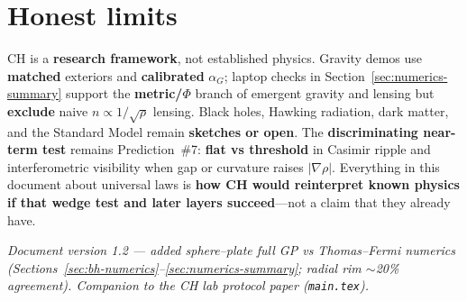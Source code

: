 \documentclass[11pt,a4paper]{article}
\begin{document}
\section{Honest limits}

CH is a \textbf{research framework}, not established physics.
Gravity demos use \textbf{matched} exteriors and \textbf{calibrated} $\alpha_G$; laptop checks in Section~\ref{sec:numerics-summary} support the \textbf{metric/$\Phi$} branch of emergent gravity and lensing but \textbf{exclude} naive $n \propto 1/\sqrt{\rho}$ lensing.
Black holes, Hawking radiation, dark matter, and the Standard Model remain \textbf{sketches or open}.
The \textbf{discriminating near-term test} remains Prediction~\#7: \textbf{flat vs threshold} in Casimir ripple and interferometric visibility when gap or curvature raises $|\nabla\rho|$.
Everything in this document about universal laws is \textbf{how CH would reinterpret known physics if that wedge test and later layers succeed}---not a claim that they already have.

\vfill
\noindent\small\textit{Document version 1.2 --- added sphere--plate full GP vs Thomas--Fermi numerics (Sections~\ref{sec:bh-numerics}--\ref{sec:numerics-summary}; radial rim $\sim$20\% agreement). Companion to the CH lab protocol paper (\texttt{main.tex}).}
\end{document}
